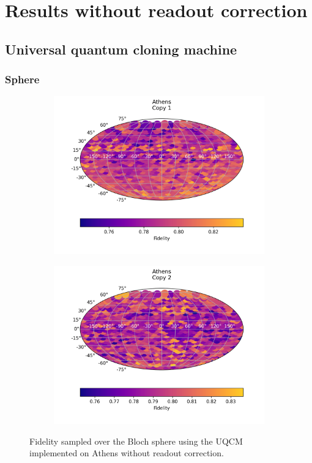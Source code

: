 \chapter{Results without readout correction}
\label{sec:appendix-a}
\section{Universal quantum cloning machine}
\subsection{Sphere}
\begin{figure}[H]
    \centering
    \begin{subfigure}{.5\textwidth}
      \centering
      \includegraphics[width=\textwidth]{Figures/UQCM/IBM/FullSphere/results_athens_copy1.png}
    \end{subfigure}%
    \begin{subfigure}{.5\textwidth}
      \centering
      \includegraphics[width=\textwidth]{Figures/UQCM/IBM/FullSphere/results_athens_copy2.png}
    \end{subfigure}
    \caption{Fidelity sampled over the Bloch sphere using the UQCM implemented on Athens without readout correction.}
    
\end{figure}


